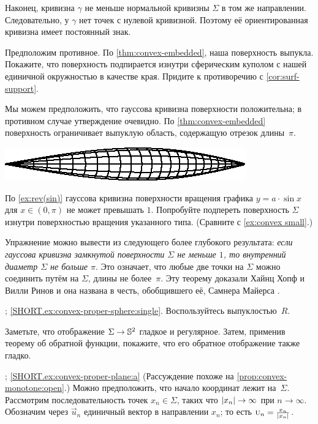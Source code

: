 \begin{multicols}{2}
Наконец, кривизна $\gamma$ не меньше нормальной кривизны $\Sigma$ в том же направлении.
Следовательно, у $\gamma$ нет точек с нулевой кривизной.
Поэтому её ориентированная кривизна имеет постоянный знак.

Предположим противное.
По \ref{thm:convex-embedded}, наша поверхность выпукла.
Покажите, что поверхность подпирается изнутри сферическим куполом с нашей единичной окружностью в качестве края.
Придите к противоречию с \ref{cor:surf-support}.

Мы можем предположить, что гауссова кривизна поверхности положительна; в противном случае утверждение очевидно.
По \ref{thm:convex-embedded} поверхность ограничивает выпуклую область, содержащую отрезок длины~$\pi$.

\begin{Figure}
\vskip-0mm
\centering
\includegraphics{asy/sin-mini}
\vskip-0mm
\end{Figure}

По \ref{ex:rev(sin)} гауссова кривизна поверхности вращения графика $y=a\cdot \sin x$ для $x\in(0,\pi)$ не может превышать $1$.
Попробуйте подпереть поверхность $\Sigma$ изнутри поверхностью вращения указанного типа.
(Сравните с \ref{ex:convex small}.)

Упражнение можно вывести из следующего более глубокого результата: \textit{если гауссова кривизна замкнутой поверхности $\Sigma$ не меньше $1$,
то внутренний диаметр $\Sigma$ не больше $\pi$}.
Это означает, что любые две точки на $\Sigma$ можно соединить путём на $\Sigma$, длины не более~$\pi$.
Эту теорему доказали Хайнц Хопф и Вилли Ринов \cite{hopf-rinow} и она названа в честь, обобщившего её, Самнера Майерса \cite{myers}.

\parbf{\ref{ex:convex-proper-sphere}}; \ref{SHORT.ex:convex-proper-sphere:single}.
Воспользуйтесь выпуклостью~$R$.

Заметьте, что отображение $\Sigma\z\to\mathbb{S}^2$ гладкое и регулярное.
Затем, применив теорему об обратной функции, покажите, что его обратное отображение также гладко.

\parbf{\ref{ex:convex-proper-plane}}; \ref{SHORT.ex:convex-proper-plane:a}
(Рассуждение похоже на \ref{prop:convex-monotone:open}.)
Можно предположить, что начало координат лежит на~$\Sigma$.
Рассмотрим последовательность точек $x_n\in \Sigma$, таких что $|x_n|\z\to \infty$ при $n\to \infty$.
Обозначим через $\vec u_n$ единичный вектор в направлении $x_n$; то есть $\vec u_n\z=\tfrac{x_n}{|x_n|}$.


\end{multicols}
